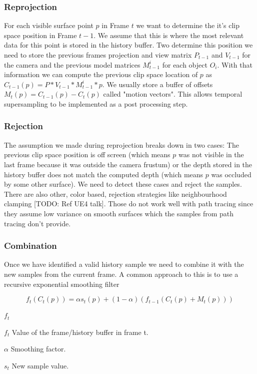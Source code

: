 \documentclass{ACGSeminar}
\begin{document}
\subsubsection{Reprojection}
For each visible surface point $p$ in Frame $t$ we want to determine the it's clip space position in Frame $t-1$. We assume that this is where the most relevant data for this point is stored in the history buffer. Two determine this position we need to store the previous frames projection and view matrix $P_{t-1}$ and $V_{t-1}$ for the camera and the previous model matrices $M^{i}_{t-1}$ for each object $O_i$. 
With that information we can compute the previous clip space location of $p$ as $C_{t-1}(p) = P * V_{t-1} * M^{i}_{t-1} * p$. We usually store a buffer of offsets $M_t(p) = C_{t-1}(p) - C_{t}(p)$ called "motion vectors".
This allows temporal supersampling to be implemented as a post processing step.

\subsubsection{Rejection}
The assumption we made during reprojection breaks down in two cases: The previous clip space position is off screen (which means $p$ was not visible in the last frame because it was outside the camera frustum) or the depth stored in the history buffer does not match the computed depth (which means $p$ was occluded by some other surface). We need to detect these cases and reject the samples. There are also other, color based, rejection strategies like neighbourhood clamping [TODO: Ref UE4 talk]. Those do not work well with path tracing since they assume low variance on smooth surfaces which the samples from path tracing don't provide.

\subsubsection{Combination}
Once we have identified a valid history sample we need to combine it with the new samples from the current frame. A common approach to this is to use a recursive exponential smoothing filter \cite{Yang:2009} 

\begin{equation}
f_t(C_{t}(p)) = \alpha s_t(p) + (1-\alpha)(f_{t-1}(C_{t}(p) + M_t(p)))
\end{equation}
\begin{labeling}{$f_t$}
\item [$f_t$] Value of the frame/history buffer in frame t.
\item [$\alpha$] Smoothing factor.
\item [$s_t$] New sample value.
\end{labeling}
\end{document}

